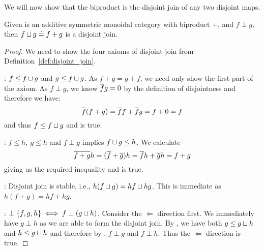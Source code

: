 We will now show that the biproduct is the disjoint join of any two disjoint maps.

\begin{lemma}\label{lem:biproduct_is_the_disjoint_join_in_cfrobx}
  Given \X is an  additive symmetric monoidal category with
biproduct $+$, and $f\perp g$, then $f\sqcup g \doteq f+g$ is a disjoint join.
\end{lemma}
\begin{proof}
  We need to show the four axioms of disjoint join from Definition~\ref{def:disjoint_join}.

   : $f \le f \sqcup g$ and $g \le f \sqcup g$.
  As $f+g = g+f$, we need only show the first part of the axiom. As $f\perp g$, we know $\overline{f}g=0$
  by the definition of disjointness and therefore we have:
  \[
    \overline{f}(f+g) = \overline{f}f + \overline{f} g = f + 0 = f
  \]
  and thus $f \le f \sqcup g$ and  is true.

  : $f \le h,\ g \le h$ and $f\perp g$ implies $f \sqcup g \le h$.  We calculate
  \[
    \overline{f+g}h = (\overline{f}+\overline{g}) h = \overline{f}h + \overline{g} h = f + g
  \]
  giving us the required inequality and  is true.

  : Disjoint join is stable, i.e., $h(f \sqcup g) = h f \sqcup h g$. This is immediate
  as $h(f+g) = hf + hg$.

  : $\perp \{f, g, h\} \iff f \perp (g\sqcup h)$. Consider the $\Longleftarrow$
  direction first. We immediately have $g\perp h$ as we are able to form the disjoint join. By
  , we have both $g \le g \sqcup h$ and $h \le g\sqcup h$ and therefore by
  , $f \perp g$ and $f\perp h$. Thus the $\Longleftarrow$ direction is true.


\end{proof}
